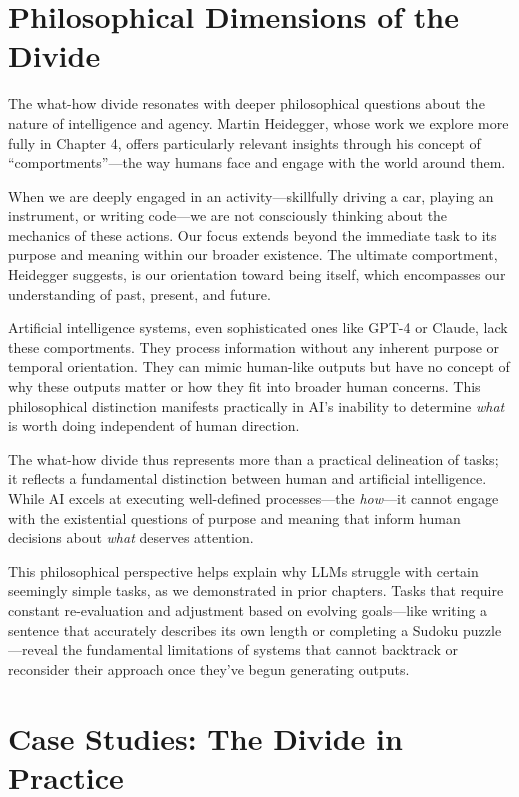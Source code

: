 \documentclass[
  Letterpaper,
]{scrbook}
\begin{document}
\section{Philosophical Dimensions of the
Divide}\label{philosophical-dimensions-of-the-divide}

The what-how divide resonates with deeper philosophical questions about
the nature of intelligence and agency. Martin
Heidegger, whose work we explore more fully
in Chapter 4, offers particularly relevant insights through his concept
of ``comportments''---the way humans face and engage with the world
around them.

When we are deeply engaged in an activity---skillfully driving a car,
playing an instrument, or writing code---we are not consciously thinking
about the mechanics of these actions. Our focus extends beyond the
immediate task to its purpose and meaning within our broader existence.
The ultimate comportment,
Heidegger suggests, is our orientation toward being itself, which
encompasses our understanding of past, present, and future.

Artificial intelligence systems, even sophisticated ones like GPT-4 or
Claude, lack these comportments. They process information without any
inherent purpose or temporal orientation. They can mimic human-like
outputs but have no concept of why these outputs matter or how they fit
into broader human concerns. This philosophical distinction manifests
practically in AI's inability to determine \emph{what} is worth doing
independent of human direction.

The what-how divide thus represents more than a practical delineation of
tasks; it reflects a fundamental distinction between human and
artificial intelligence. While AI excels at executing well-defined
processes---the \emph{how}---it cannot engage with the existential
questions of purpose and meaning that inform human decisions about
\emph{what} deserves attention.

This philosophical perspective helps explain why LLMs struggle with
certain seemingly simple tasks, as we demonstrated in prior chapters.
Tasks that require constant re-evaluation and adjustment based on
evolving goals---like writing a sentence that accurately describes its
own length or completing a Sudoku puzzle---reveal the fundamental
limitations of systems that cannot backtrack or reconsider their
approach once they've begun generating outputs.

\section{Case Studies: The Divide in
Practice}\label{case-studies-the-divide-in-practice}
\end{document}
